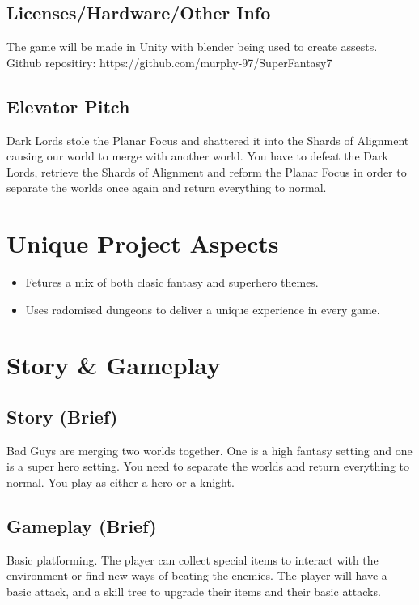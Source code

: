 \documentclass[titlepage]{article}
\begin{document}
\subsection*{\normalsize Licenses/Hardware/Other Info}
The game will be made in Unity with blender being used to create assests.  \\
Github repositiry: https://github.com/murphy-97/SuperFantasy7

\subsection*{Elevator Pitch}
Dark Lords stole the Planar Focus and shattered it into the Shards of Alignment causing our world to merge with another world. You have to defeat the Dark Lords, retrieve the Shards of Alignment and reform the Planar Focus in order to separate the worlds once again and return everything to normal. 

\section{Unique Project Aspects}
\begin{itemize}
	\item Fetures a mix of both clasic fantasy and superhero themes.
	\item Uses radomised dungeons to deliver a unique experience in every game.
\end{itemize}

\section{Story \& Gameplay}
\subsection*{Story (Brief)}
Bad Guys are merging two worlds together. One is a high fantasy setting and one is a super hero setting. You need to separate the worlds and return everything to normal. You play as either a hero or a knight. 

\subsection*{Gameplay (Brief)}
Basic platforming. The player can collect special items to interact with the environment or find new ways of beating the enemies. The player will have a basic attack, and a skill tree to upgrade their items and their basic attacks. 
\end{document}
